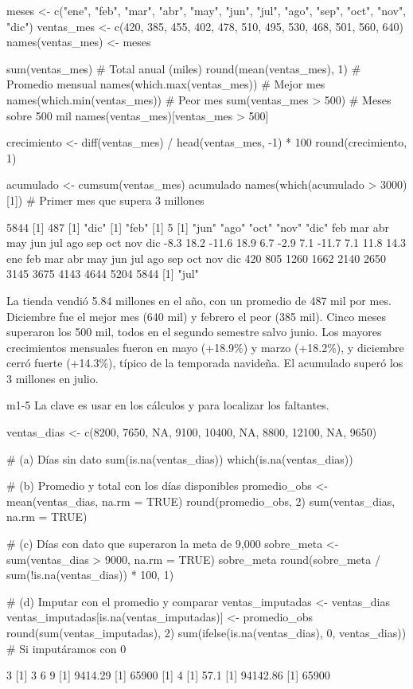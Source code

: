 \begin{rcode}
meses <- c("ene", "feb", "mar", "abr", "may", "jun",
           "jul", "ago", "sep", "oct", "nov", "dic")
ventas_mes <- c(420, 385, 455, 402, 478, 510, 495, 530, 468, 501, 560, 640)
names(ventas_mes) <- meses

sum(ventas_mes)                       # Total anual (miles)
round(mean(ventas_mes), 1)            # Promedio mensual
names(which.max(ventas_mes))          # Mejor mes
names(which.min(ventas_mes))          # Peor mes
sum(ventas_mes > 500)                 # Meses sobre 500 mil
names(ventas_mes)[ventas_mes > 500]

crecimiento <- diff(ventas_mes) / head(ventas_mes, -1) * 100
round(crecimiento, 1)

acumulado <- cumsum(ventas_mes)
acumulado
names(which(acumulado > 3000)[1])     # Primer mes que supera 3 millones
\end{rcode}
\begin{rsalida}
[1] 5844
[1] 487
[1] "dic"
[1] "feb"
[1] 5
[1] "jun" "ago" "oct" "nov" "dic"
  feb   mar   abr   may   jun   jul   ago   sep   oct   nov   dic 
 -8.3  18.2 -11.6  18.9   6.7  -2.9   7.1 -11.7   7.1  11.8  14.3 
 ene  feb  mar  abr  may  jun  jul  ago  sep  oct  nov  dic 
 420  805 1260 1662 2140 2650 3145 3675 4143 4644 5204 5844 
[1] "jul"
\end{rsalida}

La tienda vendió 5.84 millones en el año, con un promedio de 487 mil por
mes. Diciembre fue el mejor mes (640 mil) y febrero el peor (385 mil).
Cinco meses superaron los 500 mil, todos en el segundo semestre salvo
junio. Los mayores crecimientos mensuales fueron en mayo (+18.9\%) y marzo
(+18.2\%), y diciembre cerró fuerte (+14.3\%), típico de la temporada
navideña. El acumulado superó los 3 millones en julio.


\begin{solucion}{m1-5}
La clave es usar  en los cálculos y
 para localizar los faltantes.
\end{solucion}

\begin{rcode}
ventas_dias <- c(8200, 7650, NA, 9100, 10400, NA, 8800, 12100, NA, 9650)

# (a) Días sin dato
sum(is.na(ventas_dias))
which(is.na(ventas_dias))

# (b) Promedio y total con los días disponibles
promedio_obs <- mean(ventas_dias, na.rm = TRUE)
round(promedio_obs, 2)
sum(ventas_dias, na.rm = TRUE)

# (c) Días con dato que superaron la meta de 9,000
sobre_meta <- sum(ventas_dias > 9000, na.rm = TRUE)
sobre_meta
round(sobre_meta / sum(!is.na(ventas_dias)) * 100, 1)

# (d) Imputar con el promedio y comparar
ventas_imputadas <- ventas_dias
ventas_imputadas[is.na(ventas_imputadas)] <- promedio_obs
round(sum(ventas_imputadas), 2)
sum(ifelse(is.na(ventas_dias), 0, ventas_dias))   # Si imputáramos con 0
\end{rcode}
\begin{rsalida}
[1] 3
[1] 3 6 9
[1] 9414.29
[1] 65900
[1] 4
[1] 57.1
[1] 94142.86
[1] 65900
\end{rsalida}


